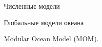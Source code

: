 \begin{chapter}{Численные модели}
\begin{section}{Глобальные модели океана}
\begin{paragraph}{Modular Ocean Model (MOM).}


\end{paragraph}
\end{section}
\end{chapter}
